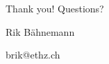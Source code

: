 \ETHslide
\section*{}
\vspace*{\fill}

\Huge{
Thank you! 
Questions?
}
\normalsize{}

Rik B\"ahnemann

brik@ethz.ch

\vspace*{\fill}
\clearpage